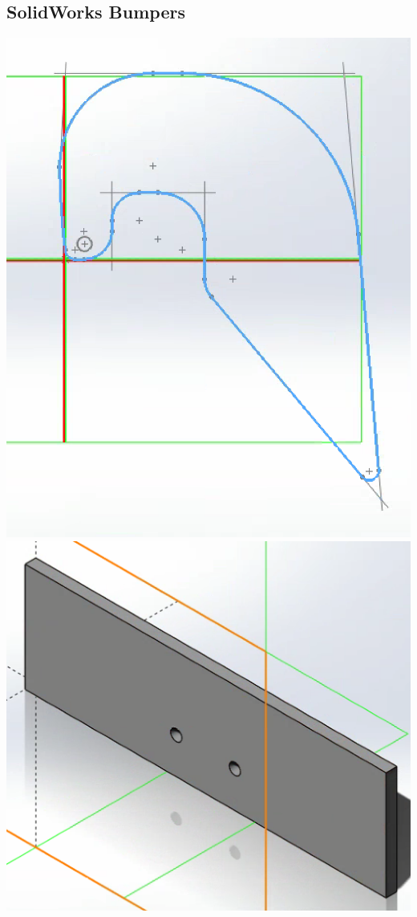 \documentclass{article}
\begin{document}
\subsection{SolidWorks Bumpers}
\includegraphics[width=\textwidth]{Bumpers.png}
\includegraphics[width=\textwidth]{BumperSupport.png}
\end{document}
